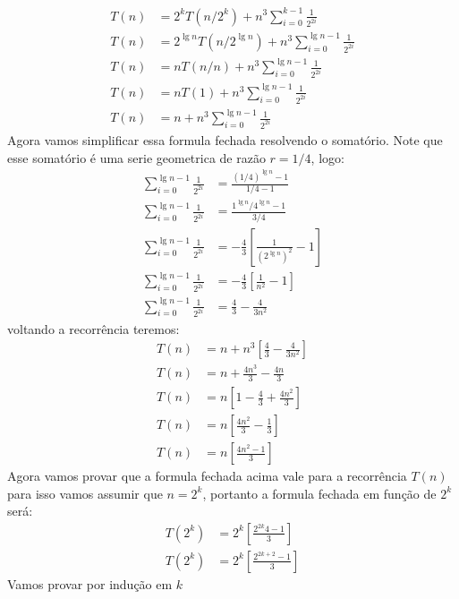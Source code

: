 \begin{align*}
 T(n) &= 2^kT(n/2^k) + n^3 \sum_{i=0}^{k-1} \frac{1}{2^{2i}} \\
 T(n) &= 2^{\lg n}T(n/2^{\lg n}) + n^3 \sum_{i=0}^{\lg n -1} \frac{1}{2^{2i}} \\
 T(n) & = n T(n/n) + n^3 \sum_{i=0}^{\lg n -1} \frac{1}{2^{2i}} \\
 T(n) & = n T(1) + n^3 \sum_{i=0}^{\lg n -1} \frac{1}{2^{2i}} \\
 T(n) & = n + n^3 \sum_{i=0}^{\lg n -1} \frac{1}{2^{2i}} 
\end{align*}
Agora vamos simplificar essa formula fechada resolvendo o somatório. Note que esse somatório é uma serie geometrica de razão $r = 1/4$, logo:
\begin{align*}
 \sum_{i=0}^{\lg n -1} \frac{1}{2^{2i}} &= \frac{(1/4)^{\lg n} - 1}{1/4 - 1} \\
 \sum_{i=0}^{\lg n -1} \frac{1}{2^{2i}} &= \frac{1^{\lg n}/4^{\lg n} - 1}{3/4} \\
 \sum_{i=0}^{\lg n -1} \frac{1}{2^{2i}} &= -\frac{4}{3} \left[ \frac{1}{(2^{\lg n})^2} - 1 \right] \\
 \sum_{i=0}^{\lg n -1} \frac{1}{2^{2i}} &= -\frac{4}{3} \left[ \frac{1}{n^2} - 1 \right] \\
 \sum_{i=0}^{\lg n -1} \frac{1}{2^{2i}} &=  \frac{4}{3} - \frac{4}{3n^2}
\end{align*}
voltando a recorrência teremos:
\begin{align*}
 T(n) &= n + n^3 \left[ \frac{4}{3} - \frac{4}{3n^2} \right] \\
 T(n) &= n + \frac{4n^3}{3} - \frac{4n}{3} \\
 T(n) &= n \left[1 - \frac{4}{3} + \frac{4n^2}{3} \right] \\
 T(n) &= n \left[\frac{4n^2}{3} - \frac{1}{3} \right] \\
 T(n) &= n \left[\frac{4n^2 - 1}{3} \right] 
\end{align*}
Agora vamos provar que a formula fechada acima vale para a recorrência $T(n)$ para isso vamos assumir que $n = 2^k$, portanto a formula fechada em função de $2^k$ será:
\begin{align*}
 T(2^k) &= 2^k \left[\frac{2^{2k}4 - 1}{3} \right] \\
 T(2^k) &= 2^k \left[\frac{2^{2k+2} - 1}{3} \right] 
\end{align*}
Vamos provar por indução em $k$

